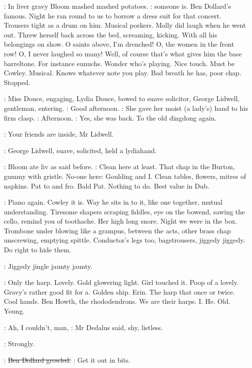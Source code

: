 :
In liver gravy Bloom mashed mashed potatoes.
\BloomInt:
someone is.
Ben Dollard's famous.
Night he ran round to us to borrow a
dress suit for that concert.
Trousers tight as a drum on him.
Musical
porkers.
Molly did laugh when he went out.
Threw herself back across the
bed,
screaming,
kicking.
With all his belongings on show.
O saints above,
I'm drenched!
O,
the women in the front row!
O,
I never laughed so many!
Well,
of course that's what gives him the base barreltone.
For instance
eunuchs.
Wonder who's playing.
Nice touch.
Must be Cowley.
Musical.
Knows whatever note you play.
Bad breath he has,
poor chap.
Stopped.

:
Miss Douce,
engaging,
Lydia Douce,
bowed to suave solicitor,
George
Lidwell,
gentleman,
entering.
\lidwell:
Good afternoon.
:
She gave her moist (a lady's) hand to his firm clasp.
\MissD:
Afternoon.
:
Yes,
she was back.
To the old dingdong again.

\MissD:
Your friends are inside,
Mr Lidwell.

:
George Lidwell,
suave,
solicited,
held a lydiahand.

:
Bloom ate liv as said before.
\BloomInt:
Clean here at least.
That chap in the
Burton,
gummy with gristle.
No-one here:
Goulding and I.
Clean tables,
flowers,
mitres of napkins.
Pat to and fro.
Bald Pat.
Nothing to do.
Best
value in Dub.

\BloomInt:
Piano again.
Cowley it is.
Way he sits in to it,
like one together,
mutual understanding.
Tiresome shapers scraping fiddles,
eye on the
bowend,
sawing the cello,
remind you of toothache.
Her high long snore.
Night we were in the box.
Trombone under blowing like a grampus,
between the acts,
other brass chap unscrewing,
emptying spittle.
Conductor's legs too,
bagstrousers,
jiggedy jiggedy.
Do right to hide
them.

:
Jiggedy jingle jaunty jaunty.

\BloomInt:
Only the harp.
Lovely.
Gold glowering light.
Girl touched it.
Poop of
a lovely.
Gravy's rather good fit for a.
Golden ship.
Erin.
The harp that
once or twice.
Cool hands.
Ben Howth,
the rhododendrons.
We are their
harps.
I.
He.
Old.
Young.

\simon:
Ah,
I couldn't,
man,
:
Mr Dedalus said,
shy,
listless.

:
Strongly.

\dollard:
\sout{Ben Dollard growled.}
\dollard:
Get it out in bits.

